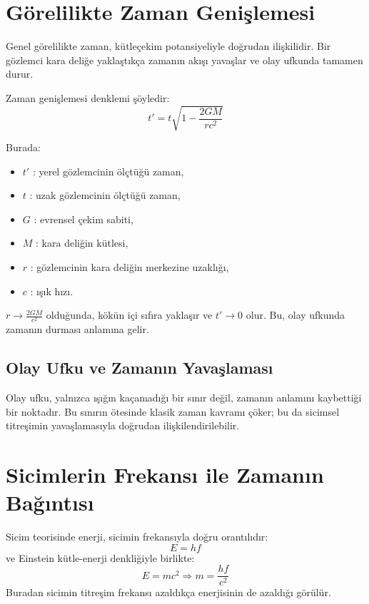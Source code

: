 \documentclass[12pt,a4paper]{article}
\begin{document}
\section{Görelilikte Zaman Genişlemesi}

Genel görelilikte zaman, kütleçekim potansiyeliyle doğrudan ilişkilidir. 
Bir gözlemci kara deliğe yaklaştıkça zamanın akışı yavaşlar ve olay ufkunda tamamen durur.

Zaman genişlemesi denklemi şöyledir:
\begin{equation}
t' = t \sqrt{1 - \frac{2GM}{r c^2}}
\end{equation}

Burada:
\begin{itemize}
\item $t'$ : yerel gözlemcinin ölçtüğü zaman,
\item $t$ : uzak gözlemcinin ölçtüğü zaman,
\item $G$ : evrensel çekim sabiti,
\item $M$ : kara deliğin kütlesi,
\item $r$ : gözlemcinin kara deliğin merkezine uzaklığı,
\item $c$ : ışık hızı.
\end{itemize}

$r \to \frac{2GM}{c^2}$ olduğunda, kökün içi sıfıra yaklaşır ve $t' \to 0$ olur. 
Bu, olay ufkunda zamanın durması anlamına gelir.

\subsection{Olay Ufku ve Zamanın Yavaşlaması}
Olay ufku, yalnızca ışığın kaçamadığı bir sınır değil, zamanın anlamını kaybettiği bir noktadır. 
Bu sınırın ötesinde klasik zaman kavramı çöker; bu da sicimsel titreşimin yavaşlamasıyla doğrudan ilişkilendirilebilir.

\section{Sicimlerin Frekansı ile Zamanın Bağıntısı}
Sicim teorisinde enerji, sicimin frekansıyla doğru orantılıdır:
\begin{equation}
E = h f
\end{equation}
ve Einstein kütle-enerji denkliğiyle birlikte:
\begin{equation}
E = mc^2 \Rightarrow m = \frac{h f}{c^2}
\end{equation}
Buradan sicimin titreşim frekansı azaldıkça enerjisinin de azaldığı görülür.
\end{document}
